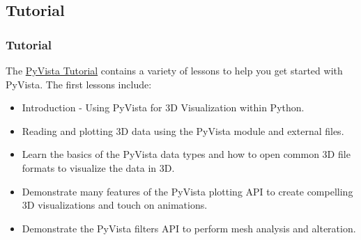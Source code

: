 \documentclass[t]{beamer}
\begin{document}
\subsection{Tutorial}
\begin{frame}
  \frametitle{Tutorial}

  The \href{https://tutorial.pyvista.org}{PyVista Tutorial} contains a variety of lessons to help you get started with PyVista. The first lessons include:

  \begin{itemize}
  \item Introduction - Using PyVista for 3D Visualization within Python.
  \item Reading and plotting 3D data using the PyVista module and external files.
  \item Learn the basics of the PyVista data types and how to open common 3D file formats to visualize the data in 3D.
  \item Demonstrate many features of the PyVista plotting API to create compelling 3D visualizations and touch on animations.
  \item Demonstrate the PyVista filters API to perform mesh analysis and alteration.
  \end{itemize}

\end{frame}

\lastframe{}
\end{document}
